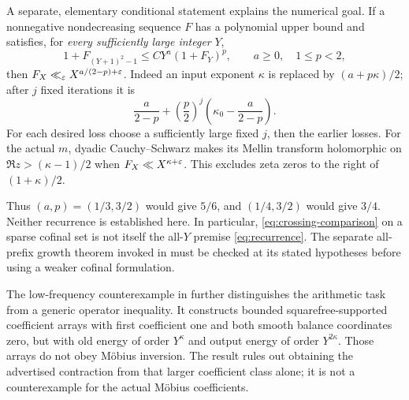 A separate, elementary conditional statement explains the numerical goal. If a nonnegative nondecreasing sequence $F$ has a polynomial upper bound and satisfies, for \emph{every sufficiently large integer} $Y$,
\begin{equation}\label{eq:recurrence}
 1+F_{(Y+1)^2-1}\le C Y^a(1+F_Y)^p,
 \qquad a\ge0,\quad 1\le p<2,
\end{equation}
then $F_X\ll_\varepsilon X^{a/(2-p)+\varepsilon}$. Indeed an input exponent $\kappa$ is replaced by $(a+p\kappa)/2$; after $j$ fixed iterations it is
\[
 \frac a{2-p}+\left(\frac p2\right)^j
                   \left(\kappa_0-\frac a{2-p}\right).
\]
For each desired loss choose a sufficiently large fixed $j$, then the earlier losses. For the actual $m$, dyadic Cauchy--Schwarz makes its Mellin transform holomorphic on $\Re z>(\kappa-1)/2$ when $F_X\ll X^{\kappa+\varepsilon}$. This excludes zeta zeros to the right of $(1+\kappa)/2$.

Thus $(a,p)=(1/3,3/2)$ would give $5/6$, and $(1/4,3/2)$ would give $3/4$. Neither recurrence is established here. In particular, \eqref{eq:crossing-comparison} on a sparse cofinal set is not itself the all-$Y$ premise \eqref{eq:recurrence}. The separate all-prefix growth theorem invoked in \cite{R994} must be checked at its stated hypotheses before using a weaker cofinal formulation.

The low-frequency counterexample in \cite[\texttt{LOW\_FREQUENCY\_ATTACK.md}]{R1003} further distinguishes the arithmetic task from a generic operator inequality. It constructs bounded squarefree-supported coefficient arrays with first coefficient one and both smooth balance coordinates zero, but with old energy of order $Y^\kappa$ and output energy of order $Y^{2\kappa}$. Those arrays do not obey M\"obius inversion. The result rules out obtaining the advertised contraction from that larger coefficient class alone; it is not a counterexample for the actual M\"obius coefficients.
